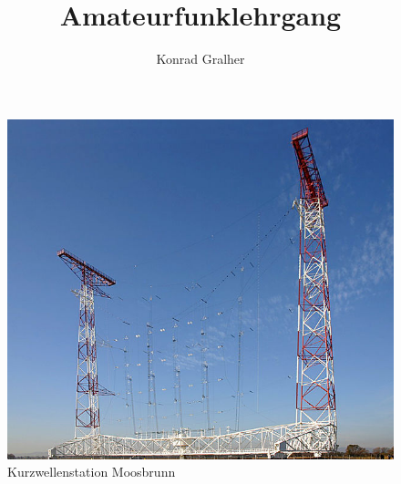 \documentclass[fontzize=12pt,paper=a4,twoside=false]{article}
\title{Amateurfunklehrgang}
\author{Konrad Gralher}
\begin{document}
\begin{titlepage}
    \bfseries\Huge{}    

    \begin{figure}
        \includegraphics[]{assets/640px-Moosbrunn_SW_Antenna}
        \caption{Kurzwellenstation Moosbrunn}  
    \end{figure}        
\end{titlepage}

\end{document}
